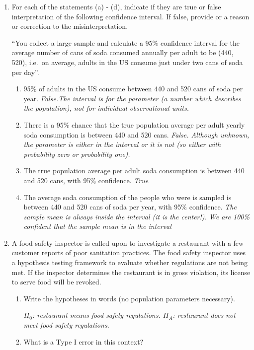 \documentclass[12pt]{article}   	%
\newcommand{\soln}[2]{\textit{\textcolor{custom_red}{#2}}}{}
\begin{document}
\begin{enumerate}
\item
  For each of the statements (a) - (d), indicate if they are true or
  false interpretation of the following confidence interval. If false,
  provide or a reason or correction to the misinterpretation.

  ``You collect a large sample and calculate a 95\% confidence interval
  for the average number of cans of soda consumed annually per adult to
  be (440, 520), i.e.~on average, adults in the US consume just under
  two cans of soda per day''.

  \begin{enumerate}

  \item
    95\% of adults in the US consume between 440 and 520 cans of soda
    per year. \soln{}{False.The interval is for the parameter (a number which describes the population),
not for individual observational units. }
  \item
    There is a 95\% chance that the true population average per adult
    yearly soda consumption is between 440 and 520 cans. \soln{}{False. Although unknown, the parameter is either in the interval or it is not (so
either with probability zero or probability one).}
  \item
    The true population average per adult soda consumption is between
    440 and 520 cans, with 95\% confidence. \soln{}{True}
  \item
    The average soda consumption of the people who were is sampled is
    between 440 and 520 cans of soda per year, with 95\% confidence. \soln{}{The sample mean is always inside the interval (it is the center!). We are
100\% confident that the sample mean is in the interval}
  \end{enumerate}
\item
  A food safety inspector is called upon to investigate a restaurant
  with a few customer reports of poor sanitation practices. The food
  safety inspector uses a hypothesis testing framework to evaluate
  whether regulations are not being met. If the inspector determines the
  restaurant is in gross violation, its license to serve food will be
  revoked.

  \begin{enumerate}
  \item
    Write the hypotheses in words (no population parameters necessary).
    
    \soln{}{$H_0$: restaurant means food safety regulations. $H_{A}$: restaurant does not meet food safety regulations.}
  \item
    What is a Type I error in this context?
    

\end{enumerate}
\end{enumerate}
\end{document}
